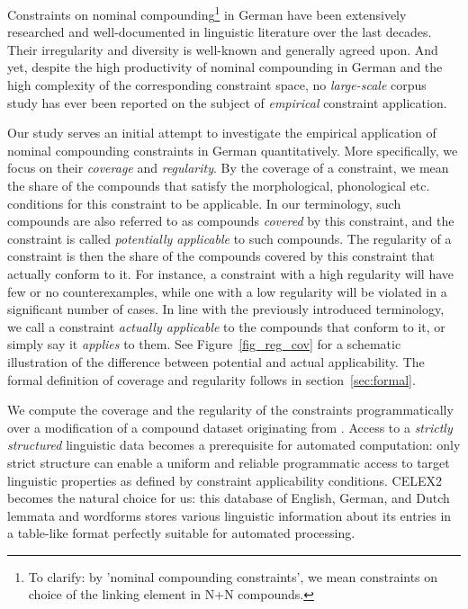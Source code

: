 \documentclass[10pt, a4paper]{article}
\begin{document}
Constraints on nominal compounding\footnote{To clarify: by 'nominal compounding constraints', we mean constraints on choice of the linking element in N+N compounds.} in German have been extensively researched and well-documented in linguistic literature over the last decades. Their irregularity and diversity is well-known and generally agreed upon. And yet, despite the high productivity of nominal compounding in German and the high complexity of the corresponding constraint space, no \textit{large-scale} corpus study has ever been reported on the subject of \textit{empirical} constraint application.

Our study serves an initial attempt to investigate the empirical application of nominal compounding constraints in German quantitatively. More specifically, we focus on their \textit{coverage} and \textit{regularity}. By the coverage of a constraint, we mean the share of the compounds that satisfy the morphological, phonological etc. conditions for this constraint to be applicable. In our terminology, such compounds are also referred to as compounds \textit{covered} by this constraint, and the constraint is called \textit{potentially applicable} to such compounds. The regularity of a constraint is then the share of the compounds covered by this constraint that actually conform to it. For instance, a constraint with a high regularity will have few or no counterexamples, while one with a low regularity will be violated in a significant number of cases. In line with the previously introduced terminology, we call a constraint \textit{actually applicable} to the compounds that conform to it, or simply say it \textit{applies} to them. See Figure~\ref{fig_reg_cov} for a schematic illustration of the difference between potential and actual applicability. The formal definition of coverage and regularity follows in section~\ref{sec:formal}.

We compute the coverage and the regularity of the constraints programmatically over a modification of a compound dataset originating from \citet{schaefer_pankratz_2018}. Access to a \textit{strictly structured} linguistic data becomes a prerequisite for automated computation: only strict structure can enable a uniform and reliable programmatic access to target linguistic properties as defined by constraint applicability conditions. CELEX2  becomes the natural choice for us: this database of English, German, and Dutch lemmata and wordforms stores various linguistic information about its entries in a table-like format perfectly suitable for automated processing.
\end{document}
